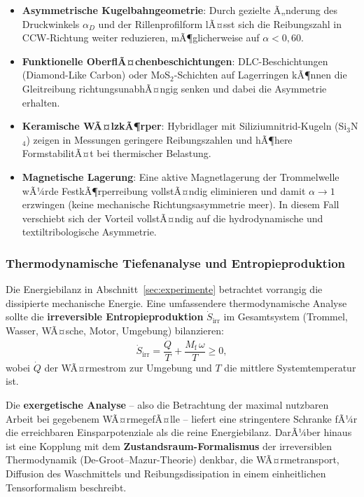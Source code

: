 ﻿\documentclass[12pt,a4paper]{article}
\theoremstyle{remark}
\begin{document}
	\begin{itemize}
		\item \textbf{Asymmetrische Kugelbahngeometrie}: Durch gezielte Ã„nderung des
		Druckwinkels $\alpha_D$ und der Rillenprofilform lÃ¤sst sich die Reibungszahl
		in CCW-Richtung weiter reduzieren, mÃ¶glicherweise auf $\alpha < 0{,}60$.
		\item \textbf{Funktionelle OberflÃ¤chenbeschichtungen}: DLC-Beschichtungen
		(Diamond-Like Carbon) oder MoS$_2$-Schichten auf Lagerringen kÃ¶nnen die
		Gleitreibung richtungsunabhÃ¤ngig senken und dabei die Asymmetrie erhalten.
		\item \textbf{Keramische WÃ¤lzkÃ¶rper}: Hybridlager mit Siliziumnitrid-Kugeln
		(Si$_3$N$_4$) zeigen in Messungen geringere Reibungszahlen und hÃ¶here FormstabilitÃ¤t
		bei thermischer Belastung.
		\item \textbf{Magnetische Lagerung}: Eine aktive Magnetlagerung der Trommelwelle
		wÃ¼rde FestkÃ¶rperreibung vollstÃ¤ndig eliminieren und damit $\alpha \to 1$ erzwingen
		(keine mechanische Richtungsasymmetrie meer). In diesem Fall verschiebt sich der
		Vorteil vollstÃ¤ndig auf die hydrodynamische und textiltribologische Asymmetrie.
	\end{itemize}
	
	\subsubsection{Thermodynamische Tiefenanalyse und Entropieproduktion}
	
	Die Energiebilanz in Abschnitt~\ref{sec:experimente} betrachtet vorrangig die
	dissipierte mechanische Energie. Eine umfassendere thermodynamische Analyse sollte
	die \textbf{irreversible Entropieproduktion} $\dot{S}_{\mathrm{irr}}$ im Gesamtsystem
	(Trommel, Wasser, WÃ¤sche, Motor, Umgebung) bilanzieren:
	\begin{equation}
		\dot{S}_{\mathrm{irr}} = \frac{\dot{Q}}{T} + \frac{M_{\mathrm{f}}\,\omega}{T}
		\geq 0,
	\end{equation}
	wobei $\dot{Q}$ der WÃ¤rmestrom zur Umgebung und $T$ die mittlere Systemtemperatur ist.
	
	Die \textbf{exergetische Analyse} -- also die Betrachtung der maximal nutzbaren Arbeit
	bei gegebenem WÃ¤rmegefÃ¤lle -- liefert eine stringentere Schranke fÃ¼r die erreichbaren
	Einsparpotenziale als die reine Energiebilanz.
	DarÃ¼ber hinaus ist eine Kopplung mit dem \textbf{Zustandsraum-Formalismus} der
	irreversiblen Thermodynamik (De-Groot--Mazur-Theorie) denkbar, die WÃ¤rmetransport,
	Diffusion des Waschmittels und Reibungsdissipation in einem einheitlichen
	Tensorformalism beschreibt.
	
\end{document}
